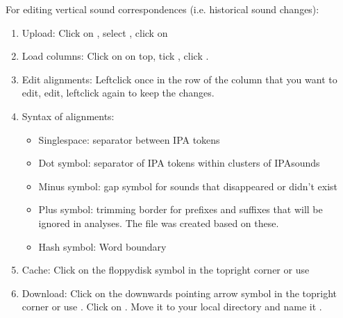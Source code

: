 \documentclass[letterpaper,10pt,english]{sphinxmanual}
\begin{document}
\sphinxAtStartPar
For editing vertical sound correspondences (i.e. historical sound changes):
\begin{enumerate}
%
\item {} 
\sphinxAtStartPar
Upload: Click on , select , click on

\item {} 
\sphinxAtStartPar
Load columns: Click on  on top, tick ,
click .

\item {} 
\sphinxAtStartPar
Edit alignments: Left\sphinxhyphen{}click once in the row of the 
column that you want to edit, edit, left\sphinxhyphen{}click again to keep the changes.

\item {} 
\sphinxAtStartPar
Syntax of alignments:
\begin{itemize}
\item {} 
\sphinxAtStartPar
Single\sphinxhyphen{}space: separator between IPA tokens

\item {} 
\sphinxAtStartPar
Dot symbol: separator of IPA tokens within clusters of IPA\sphinxhyphen{}sounds

\item {} 
\sphinxAtStartPar
Minus symbol: gap symbol for sounds that disappeared or didn’t exist

\item {} 
\sphinxAtStartPar
Plus symbol: trimming border for prefixes and suffixes that will be
ignored in analyses. The file  was created
based on these.

\item {} 
\sphinxAtStartPar
Hash symbol: Word boundary

\end{itemize}

\item {} 
\sphinxAtStartPar
Cache: Click on the floppy\sphinxhyphen{}disk symbol in the top\sphinxhyphen{}right corner or use

\item {} 
\sphinxAtStartPar
Download: Click on the downwards pointing arrow symbol in the top\sphinxhyphen{}right
corner or use . Click on . Move it to your local
 directory and name it .

\end{enumerate}
\end{document}
